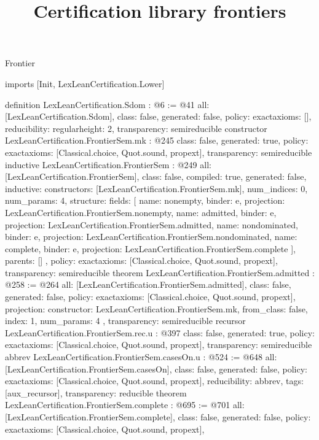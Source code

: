 \begin{lexlean}{Frontier}
\title{Certification library frontiers}
\begin{coremodule}
imports [Init, LexLeanCertification.Lower]

definition LexLeanCertification.Sdom : @6 := @41 {
  all: [LexLeanCertification.Sdom],
  class: false,
  generated: false,
  policy: exact{axioms: []},
  reducibility: regular{height: 2},
  transparency: semireducible
}
constructor LexLeanCertification.FrontierSem.mk : @245 {
  class: false,
  generated: true,
  policy: exact{axioms: [Classical.choice, Quot.sound, propext]},
  transparency: semireducible
}
inductive LexLeanCertification.FrontierSem : @249 {
  all: [LexLeanCertification.FrontierSem],
  class: false,
  compiled: true,
  generated: false,
  inductive: {
    constructors: [LexLeanCertification.FrontierSem.mk],
    num_indices: 0,
    num_params: 4,
    structure: {
      fields: [
        {name: nonempty, binder: e, projection: LexLeanCertification.FrontierSem.nonempty},
        {name: admitted, binder: e, projection: LexLeanCertification.FrontierSem.admitted},
        {name: nondominated, binder: e, projection: LexLeanCertification.FrontierSem.nondominated},
        {name: complete, binder: e, projection: LexLeanCertification.FrontierSem.complete}
      ],
      parents: []
    }
  },
  policy: exact{axioms: [Classical.choice, Quot.sound, propext]},
  transparency: semireducible
}
theorem LexLeanCertification.FrontierSem.admitted : @258 := @264 {
  all: [LexLeanCertification.FrontierSem.admitted],
  class: false,
  generated: false,
  policy: exact{axioms: [Classical.choice, Quot.sound, propext]},
  projection: {
    constructor: LexLeanCertification.FrontierSem.mk,
    from_class: false,
    index: 1,
    num_params: 4
  },
  transparency: semireducible
}
recursor LexLeanCertification.FrontierSem.rec.{u} : @397 {
  class: false,
  generated: true,
  policy: exact{axioms: [Classical.choice, Quot.sound, propext]},
  transparency: semireducible
}
abbrev LexLeanCertification.FrontierSem.casesOn.{u} : @524 := @648 {
  all: [LexLeanCertification.FrontierSem.casesOn],
  class: false,
  generated: false,
  policy: exact{axioms: [Classical.choice, Quot.sound, propext]},
  reducibility: abbrev{},
  tags: [aux_recursor],
  transparency: reducible
}
theorem LexLeanCertification.FrontierSem.complete : @695 := @701 {
  all: [LexLeanCertification.FrontierSem.complete],
  class: false,
  generated: false,
  policy: exact{axioms: [Classical.choice, Quot.sound, propext]},
}
\end{coremodule}
\end{lexlean}
